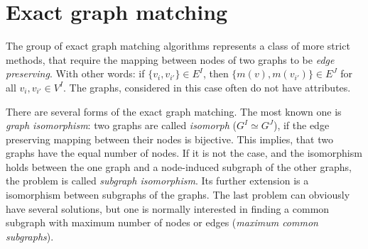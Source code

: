 \section{Exact graph matching}
The group of exact graph matching algorithms represents a class of more strict methods, that require the mapping between nodes of two graphs to be \emph{edge preserving}. With other words: if $\{v_i,v_{i'}\}\in E^I$, then $\{m(v),m(v_{i'})\}\in E^J$ for all $v_i,v_{i'}\in V^I$. The graphs, considered in this case often do not have attributes.

There are several forms of the exact graph matching. The most known one is \emph{graph isomorphism}: two graphs are called \emph{isomorph} ($G^I\simeq G^J$), if the edge preserving mapping between their nodes is bijective. This implies, that two graphs have the equal number of nodes. If it is not the case, and the isomorphism holds between the one graph and a node-induced subgraph of the other graphs, the problem is called \emph{subgraph isomorphism}. Its further extension is a isomorphism between subgraphs of the graphs. The last problem can obviously have several solutions, but one is normally interested in finding a common subgraph with maximum number of nodes or edges (\emph{maximum common subgraphs}).  

